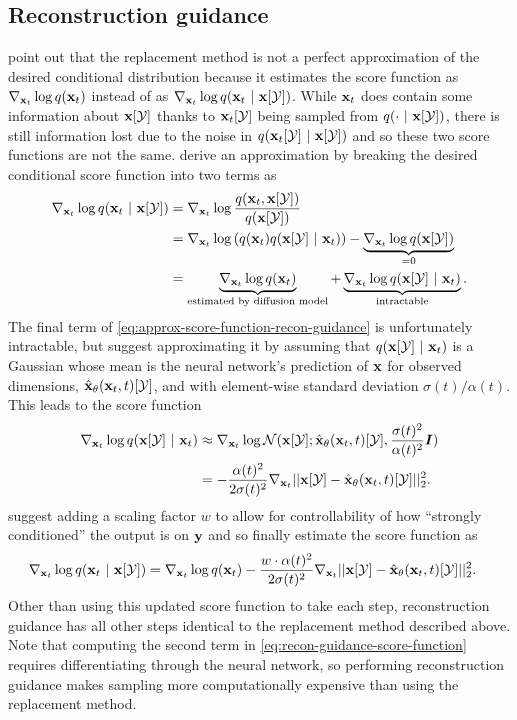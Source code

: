 \subsection{Reconstruction guidance} \label{sec:reconstruction-guidance}
\citet{ho2022video} point out that the replacement method is not a perfect approximation of the desired conditional distribution because it estimates the score function as $\nabla_{{\mathbf{x}}_t} \log q({\mathbf{x}}_t)$ instead of as $\nabla_{{\mathbf{x}}_t} \log q({\mathbf{x}}_t~|~{\mathbf{x}}[{\mathcal{Y}}])$. While ${\mathbf{x}}_t$ does contain some information about ${\mathbf{x}}[{\mathcal{Y}}]$ thanks to ${\mathbf{x}}_t[{\mathcal{Y}}]$ being sampled from $q(\cdot ~|~ {\mathbf{x}}[{\mathcal{Y}}])$, there is still information lost due to the noise in $q({\mathbf{x}}_t[{\mathcal{Y}}] ~|~ {\mathbf{x}}[{\mathcal{Y}}])$ and so these two score functions are not the same. \citet{ho2022video} derive an approximation by breaking the desired conditional score function into two terms as
\begin{align}
    \nabla_{{\mathbf{x}}_t} \log q({\mathbf{x}}_t~|~{\mathbf{x}}[{\mathcal{Y}}]) &= \nabla_{{\mathbf{x}}_t} \log \frac{q({\mathbf{x}}_t, {\mathbf{x}}[{\mathcal{Y}}])}{q({\mathbf{x}}[{\mathcal{Y}}])}\\
    &= \nabla_{{\mathbf{x}}_t} \log \left( q({\mathbf{x}}_t) q({\mathbf{x}}[{\mathcal{Y}}]~|~{\mathbf{x}}_t) \right) - \underbrace{\nabla_{{\mathbf{x}}_t} \log q({\mathbf{x}}[{\mathcal{Y}}])}_{=0} \\
    &= \underbrace{\nabla_{{\mathbf{x}}_t} \log q({\mathbf{x}}_t)}_\text{estimated by diffusion model} + \underbrace{\nabla_{{\mathbf{x}}_t} \log q({\mathbf{x}}[{\mathcal{Y}}]~|~{\mathbf{x}}_t)}_\text{intractable}. \label{eq:approx-score-function-recon-guidance}
\end{align}
The final term of \cref{eq:approx-score-function-recon-guidance} is unfortunately intractable, but \citet{ho2022video} suggest approximating it by assuming that $q({\mathbf{x}}[{\mathcal{Y}}]~|~{\mathbf{x}}_t)$ is a Gaussian whose mean is the neural network's prediction of ${\mathbf{x}}$ for observed dimensions, $\hat{{\mathbf{x}}}_\theta({\mathbf{x}}_t, t)[{\mathcal{Y}}]$, and with element-wise standard deviation $\sigma(t) / \alpha(t)$. This leads to the score function
\begin{align}
    \nabla_{{\mathbf{x}}_t} \log q({\mathbf{x}}[{\mathcal{Y}}]~|~{\mathbf{x}}_t) &\approx \nabla_{{\mathbf{x}}_t} \log {\mathcal{N}}( {\mathbf{x}}[{\mathcal{Y}}]; \hat{{\mathbf{x}}}_\theta({\mathbf{x}}_t, t)[{\mathcal{Y}}], \frac{\sigma(t)^2}{\alpha(t)^2} {\bm{I}} ) \\
    &= -\frac{\alpha(t)^2}{2\sigma(t)^2} \nabla_{{\mathbf{x}}_t} || {\mathbf{x}}[{\mathcal{Y}}] - \hat{{\mathbf{x}}}_\theta({\mathbf{x}}_t, t)[{\mathcal{Y}}] ||_2^2.
\end{align}
\citet{ho2022video} suggest adding a scaling factor $w$ to allow for controllability of how ``strongly conditioned'' the output is on ${\mathbf{y}}$ and so finally estimate the score function as 
\begin{align}
    \nabla_{{\mathbf{x}}_t} \log q({\mathbf{x}}_t~|~{\mathbf{x}}[{\mathcal{Y}}]) &= \nabla_{{\mathbf{x}}_t} \log q({\mathbf{x}}_t) - \frac{w \cdot \alpha(t)^2}{2\sigma(t)^2} \nabla_{{\mathbf{x}}_t} || {\mathbf{x}}[{\mathcal{Y}}] - \hat{{\mathbf{x}}}_\theta({\mathbf{x}}_t, t)[{\mathcal{Y}}] ||_2^2 . \label{eq:recon-guidance-score-function}
\end{align}
Other than using this updated score function to take each step, reconstruction guidance has all other steps identical to the replacement method described above. Note that computing the second term in \cref{eq:recon-guidance-score-function} requires differentiating through the neural network, so performing reconstruction guidance makes sampling more computationally expensive than using the replacement method. 

